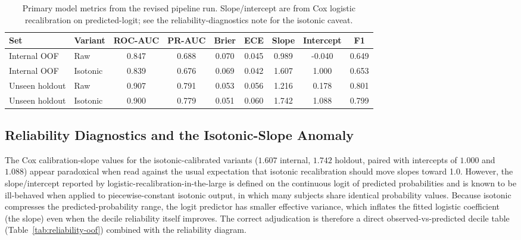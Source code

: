 \documentclass[11pt,a4paper]{article}
\begin{document}
\begin{table}[h!]
\centering
\small
\caption{Primary model metrics from the revised pipeline run. Slope/intercept are from Cox logistic recalibration on predicted-logit; see the reliability-diagnostics note for the isotonic caveat.}
\label{tab:primary-metrics}
\begin{tabular}{llccccccc}
\toprule
Set & Variant & ROC-AUC & PR-AUC & Brier & ECE & Slope & Intercept & F1 \\
\midrule
Internal OOF & Raw & 0.847 & 0.688 & 0.070 & 0.045 & 0.989 & -0.040 & 0.649 \\
Internal OOF & Isotonic & 0.839 & 0.676 & 0.069 & 0.042 & 1.607 & 1.000 & 0.653 \\
Unseen holdout & Raw & 0.907 & 0.791 & 0.053 & 0.056 & 1.216 & 0.178 & 0.801 \\
Unseen holdout & Isotonic & 0.900 & 0.779 & 0.051 & 0.060 & 1.742 & 1.088 & 0.799 \\
\bottomrule
\end{tabular}
\end{table}

\subsection{Reliability Diagnostics and the Isotonic-Slope Anomaly}
The Cox calibration-slope values for the isotonic-calibrated variants ($1.607$ internal, $1.742$ holdout, paired with intercepts of $1.000$ and $1.088$) appear paradoxical when read against the usual expectation that isotonic recalibration should move slopes toward 1.0. However, the slope/intercept reported by logistic-recalibration-in-the-large is defined on the continuous logit of predicted probabilities and is known to be ill-behaved when applied to piecewise-constant isotonic output, in which many subjects share identical probability values. Because isotonic compresses the predicted-probability range, the logit predictor has smaller effective variance, which inflates the fitted logistic coefficient (the slope) even when the decile reliability itself improves\cite{NiculescuMizil2005,VanCalster2019}. The correct adjudication is therefore a direct observed-vs-predicted decile table (Table~\ref{tab:reliability-oof}) combined with the reliability diagram.
\end{document}
